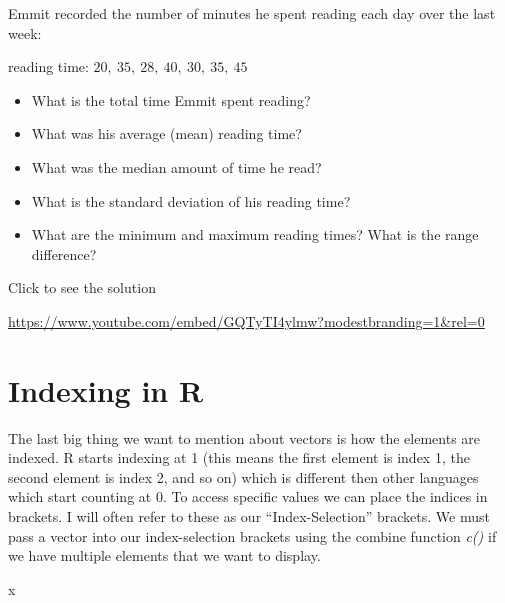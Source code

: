 \documentclass[
  letterpaper,
  DIV=11,
  numbers=noendperiod]{scrreprt}
\newenvironment{Shaded}{\begin{snugshade}}{\end{snugshade}}
\newcommand{\NormalTok}[1]{\textcolor[rgb]{0.00,0.23,0.31}{#1}}
\providecommand{\tightlist}{%
  \setlength{\itemsep}{0pt}\setlength{\parskip}{0pt}}
\begin{document}
\begin{tcolorbox}[enhanced jigsaw, colbacktitle=quarto-callout-tip-color!10!white, breakable, bottomrule=.15mm, colframe=quarto-callout-tip-color-frame, left=2mm, opacitybacktitle=0.6, title=\textcolor{quarto-callout-tip-color}{\faLightbulb}\hspace{0.5em}{Try it Out}, leftrule=.75mm, opacityback=0, rightrule=.15mm, titlerule=0mm, bottomtitle=1mm, colback=white, toprule=.15mm, arc=.35mm, toptitle=1mm, coltitle=black]

Emmit recorded the number of minutes he spent reading each day over the
last week:

reading time: \(20,\ 35,\ 28,\ 40,\ 30,\ 35,\ 45\)

\begin{itemize}
\tightlist
\item
  What is the total time Emmit spent reading?
\item
  What was his average (mean) reading time?
\item
  What was the median amount of time he read?
\item
  What is the standard deviation of his reading time?
\item
  What are the minimum and maximum reading times? What is the range
  difference?
\end{itemize}

Click to see the solution

\url{https://www.youtube.com/embed/GQTyTI4ylmw?modestbranding=1&rel=0}

\end{tcolorbox}

\section{Indexing in R}\label{indexing-in-r}

The last big thing we want to mention about vectors is how the elements
are indexed. R starts indexing at 1 (this means the first element is
index 1, the second element is index 2, and so on) which is different
then other languages which start counting at 0. To access specific
values we can place the indices in brackets. I will often refer to these
as our ``Index-Selection'' brackets. We must pass a vector into our
index-selection brackets using the combine function \emph{c()} if we
have multiple elements that we want to display.

\begin{Shaded}
\begin{Highlighting}[]
\NormalTok{x}
\end{Highlighting}
\end{Shaded}
\end{document}
